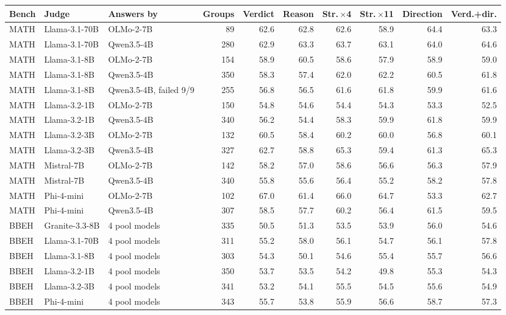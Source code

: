 \begin{tabular}{lll r rrrrrr}
\toprule
Bench & Judge & Answers by & Groups & Verdict & Reason & Str.\,$\times$4 & Str.\,$\times$11 & Direction & Verd.+dir. \\
\midrule
MATH & Llama-3.1-70B & OLMo-2-7B & 89 & 62.6 & 62.8 & 62.6 & 58.9 & 64.4 & 63.3 \\
MATH & Llama-3.1-70B & Qwen3.5-4B & 280 & 62.9 & 63.3 & 63.7 & 63.1 & 64.0 & 64.6 \\
MATH & Llama-3.1-8B & OLMo-2-7B & 154 & 58.9 & 60.5 & 58.6 & 57.9 & 58.9 & 59.0 \\
MATH & Llama-3.1-8B & Qwen3.5-4B & 350 & 58.3 & 57.4 & 62.0 & 62.2 & 60.5 & 61.8 \\
MATH & Llama-3.1-8B & Qwen3.5-4B, failed 9/9 & 255 & 56.8 & 56.5 & 61.6 & 61.8 & 59.9 & 61.6 \\
MATH & Llama-3.2-1B & OLMo-2-7B & 150 & 54.8 & 54.6 & 54.4 & 54.3 & 53.3 & 52.5 \\
MATH & Llama-3.2-1B & Qwen3.5-4B & 340 & 56.2 & 54.4 & 58.3 & 59.9 & 61.8 & 59.9 \\
MATH & Llama-3.2-3B & OLMo-2-7B & 132 & 60.5 & 58.4 & 60.2 & 60.0 & 56.8 & 60.1 \\
MATH & Llama-3.2-3B & Qwen3.5-4B & 327 & 62.7 & 58.8 & 65.3 & 59.4 & 61.3 & 65.3 \\
MATH & Mistral-7B & OLMo-2-7B & 142 & 58.2 & 57.0 & 58.6 & 56.6 & 56.3 & 57.9 \\
MATH & Mistral-7B & Qwen3.5-4B & 340 & 55.8 & 55.6 & 56.4 & 55.2 & 58.2 & 57.8 \\
MATH & Phi-4-mini & OLMo-2-7B & 102 & 67.0 & 61.4 & 66.0 & 64.7 & 53.3 & 62.7 \\
MATH & Phi-4-mini & Qwen3.5-4B & 307 & 58.5 & 57.7 & 60.2 & 56.4 & 61.5 & 59.5 \\
BBEH & Granite-3.3-8B & 4 pool models & 335 & 50.5 & 51.3 & 53.5 & 53.9 & 56.0 & 54.6 \\
BBEH & Llama-3.1-70B & 4 pool models & 311 & 55.2 & 58.0 & 56.1 & 54.7 & 56.1 & 57.8 \\
BBEH & Llama-3.1-8B & 4 pool models & 303 & 54.3 & 50.1 & 54.6 & 55.4 & 55.7 & 56.6 \\
BBEH & Llama-3.2-1B & 4 pool models & 350 & 53.7 & 53.5 & 54.2 & 49.8 & 55.3 & 54.3 \\
BBEH & Llama-3.2-3B & 4 pool models & 341 & 53.2 & 54.1 & 55.5 & 54.5 & 55.6 & 54.9 \\
BBEH & Phi-4-mini & 4 pool models & 343 & 55.7 & 53.8 & 55.9 & 56.6 & 58.7 & 57.3 \\

\end{tabular}
